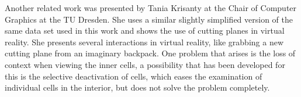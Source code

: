 Another related work was presented by Tania Krisanty at the Chair of Computer Graphics at the TU Dresden. She uses a similar slightly simplified version of the same data set used in this work and shows the use of cutting planes in virtual reality.\cite{krisanty_2022}
She presents several interactions in virtual reality, like grabbing a new cutting plane from an imaginary backpack. 
One problem that arises is the loss of context when viewing the inner cells, a possibility that has been developed for this is the selective deactivation of cells, which eases the examination of individual cells in the interior, but does not solve the problem completely.

